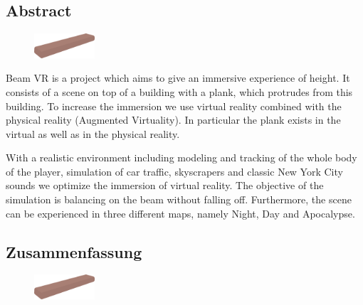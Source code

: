 \begin{spacing}{1}

    \chapter*{Abstract}

\end{spacing}

\begin{figure}

    \begin{center}

        \includegraphics[width=0.2\textwidth]{pics/abstract_picture_1}

    \end{center}

\end{figure}

Beam VR is a project which aims to give an immersive experience of height.
It consists of a scene on top of a building with a plank, which protrudes from this building.
To increase the immersion we use virtual reality combined with the physical reality (Augmented Virtuality).
In particular the plank exists in the virtual as well as in the physical reality.

With a realistic environment including modeling and tracking of the whole body of the player, simulation of car traffic, skyscrapers and classic New York City sounds we optimize the immersion of virtual reality.
The objective of the simulation is balancing on the beam without falling off.
Furthermore, the scene can be experienced in three different maps, namely Night, Day and Apocalypse.

\newpage

\begin{spacing}{1}

    \chapter*{Zusammenfassung}

\end{spacing}

\begin{figure}

    \begin{center}

        \includegraphics[width=0.2\textwidth]{pics/abstract_picture_1}

    \end{center}

\end{figure}

